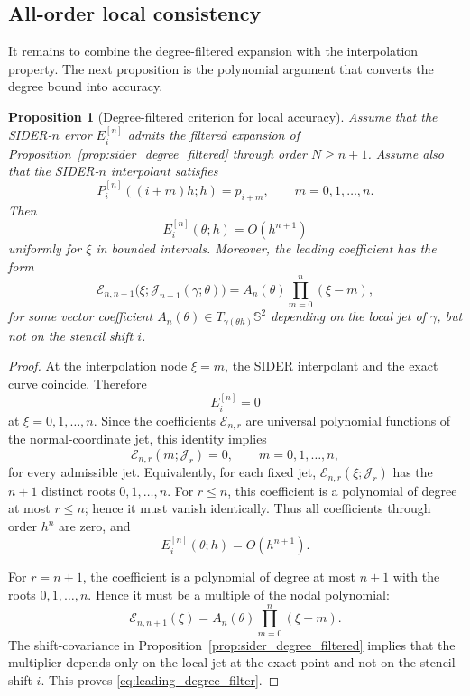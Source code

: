 \documentclass[a4paper,11pt]{article}
\newcommand{\bS}{\mathbb{S}}
\newtheorem{prop}{Proposition}
\numberwithin{equation}{section}
\begin{document}
\subsection{All-order local consistency}

It remains to combine the degree-filtered expansion with the interpolation
property.  The next proposition is the polynomial argument that converts the
degree bound into accuracy.

\begin{prop}[Degree-filtered criterion for local accuracy]
\label{prop:degree_filter_criterion}
Assume that the SIDER-\(n\) error \(E_i^{[n]}\) admits the filtered expansion
of Proposition~\ref{prop:sider_degree_filtered} through order \(N\ge n+1\).
Assume also that the SIDER-\(n\) interpolant satisfies
\[
        P_i^{[n]}((i+m)h;h)=p_{i+m},
        \qquad m=0,1,\ldots,n.
\]
Then
\[
        E_i^{[n]}(\theta;h)=O(h^{n+1})
\]
uniformly for \(\xi\) in bounded intervals.  Moreover, the leading coefficient
has the form
\begin{equation}
\label{eq:leading_degree_filter}
        \mathcal E_{n,n+1}
        \bigl(\xi;\mathcal J_{n+1}(\gamma;\theta)\bigr)
        =
        A_n(\theta)
        \prod_{m=0}^{n}(\xi-m),
\end{equation}
for some vector coefficient
\(A_n(\theta)\in T_{\gamma(\theta h)}\bS^2\) depending on the local jet of
\(\gamma\), but not on the stencil shift \(i\).
\end{prop}

\begin{proof}
At the interpolation node \(\xi=m\), the SIDER interpolant and the exact curve
coincide.  Therefore
\[
        E_i^{[n]}=0
\]
at \(\xi=0,1,\ldots,n\).  Since the coefficients
\(\mathcal E_{n,r}\) are universal polynomial functions of the normal-coordinate
jet, this identity implies
\[
        \mathcal E_{n,r}(m;\mathcal J_r)=0,
        \qquad m=0,1,\ldots,n,
\]
for every admissible jet.  Equivalently, for each fixed jet,
\(\mathcal E_{n,r}(\xi;\mathcal J_r)\) has the \(n+1\) distinct roots
\(0,1,\ldots,n\).  For \(r\le n\), this coefficient is a polynomial of degree
at most \(r\le n\); hence it must vanish identically.  Thus all coefficients
through order \(h^n\) are zero, and
\[
        E_i^{[n]}(\theta;h)=O(h^{n+1}).
\]

For \(r=n+1\), the coefficient is a polynomial of degree at most \(n+1\) with
the roots \(0,1,\ldots,n\).  Hence it must be a multiple of the nodal
polynomial:
\[
        \mathcal E_{n,n+1}(\xi)
        =
        A_n(\theta)\prod_{m=0}^{n}(\xi-m).
\]
The shift-covariance in Proposition~\ref{prop:sider_degree_filtered} implies
that the multiplier depends only on the local jet at the exact point and not
on the stencil shift \(i\).  This proves \eqref{eq:leading_degree_filter}.
\end{proof}
\end{document}
